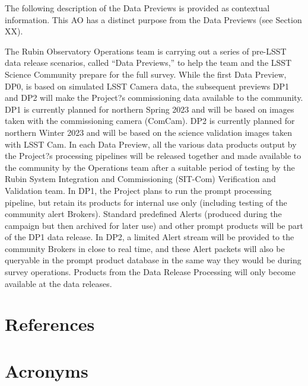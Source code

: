 \documentclass[SE,authoryear,toc]{lsstdoc}
\begin{document}
The following description of the Data Previews is provided as contextual information. This AO has a distinct purpose from the Data Previews (see Section XX).

The Rubin Observatory Operations team is carrying out a series of pre-LSST data release scenarios, called ``Data Previews,'' to help the team and the LSST Science Community prepare for the full survey. While the first Data Preview, DP0, is based on simulated LSST Camera data, the subsequent previews DP1 and DP2 will make the Project?s commissioning data available to the community. DP1 is currently planned for northern Spring 2023 and will be based on images taken with the commissioning camera (ComCam). DP2 is currently planned for northern Winter 2023 and will be based on the science validation images taken with LSST Cam. In each Data Preview, all the various data products output by the Project?s processing pipelines will be released together and made available to the community by the  Operations team after a suitable period of testing by the Rubin System Integration and Commissioning (SIT-Com) Verification and Validation team. In DP1, the Project plans to run the prompt processing pipeline, but retain its products for internal use only (including testing of the community alert Brokers). Standard predefined Alerts (produced during the campaign but then archived for later use) and other prompt products will be part of the DP1 data release. In DP2, a limited Alert stream will be provided to the community Brokers in close to real time, and these Alert packets will also be queryable in the prompt product database in the same way they would be during survey operations. Products from the Data Release Processing will only become available at the data releases. 

\section{References} \label{sec:bib}
\renewcommand{\refname}{} %


\section{Acronyms} \label{sec:acronyms}

\end{document}
